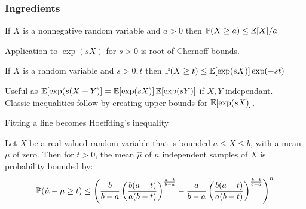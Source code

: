 \begin{frame}
\frametitle{Ingredients}
\begin{theorem}
If $X$ is a nonnegative random variable and $a>0$ then $\operatorname{\mathbb{P}}(X\ge a)\le \operatorname{\mathbb{E}}[X]/a$
\end{theorem}

Application to $\exp(sX)$ for $s>0$ is root of Chernoff bounds.
\begin{theorem}
If $X$ is a random variable and $s>0,t$ then $\operatorname{\mathbb{P}}(X\ge t)\le \operatorname{\mathbb{E}}[\exp(sX)]\exp(-st)$
\end{theorem}
Useful as $\operatorname{\mathbb{E}}[\exp(s(X+Y)] = \operatorname{\mathbb{E}}[\exp(sX)]\operatorname{\mathbb{E}}[\exp(sY)]$ if $X,Y$ independant.\\
Classic inequalities follow by creating upper bounds for $\operatorname{\mathbb{E}}[\exp(sX)]$.
\end{frame}






\begin{frame}
Fitting a line becomes Hoeffding's inequality \cite{hoeffding1}

\begin{theorem}\label{hoeffdings_inequality22}
Let $X$ be a real-valued random variable that is bounded $a\le X\le b$, with a mean $\mu$ of zero.  Then for $t>0$, the mean $\hat{\mu}$ of $n$ independent samples of $X$ is probability bounded by:
\begin{equation}\operatorname{\mathbb{P}}(\hat{\mu}-\mu\ge t)\le \left( \frac{b}{b-a}\left(\frac{b(a-t)}{a(b-t)}\right)^{\frac{a-t}{b-a}} -\frac{a}{b-a}\left(\frac{b(a-t)}{a(b-t)}\right)^{\frac{b-t}{b-a}}  \right)^n
\end{equation}
\end{theorem}
\end{frame}

